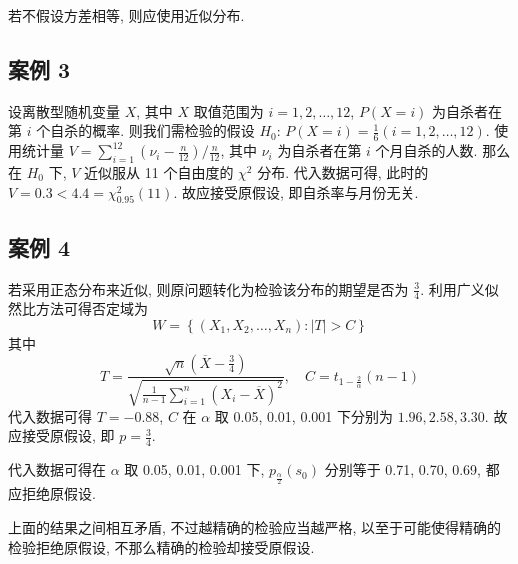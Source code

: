 \documentclass[\ROOT/main.tex]{subfiles}
\begin{document}
若不假设方差相等, 则应使用近似分布.

\subsection{案例 3}
设离散型随机变量 $X$, 其中 $X$ 取值范围为 $i = 1, 2, \dots, 12$, $P \left( X = i \right)$ 为自杀者在第 $i$ 个自杀的概率.
则我们需检验的假设 $H_0$: $P \left( X = i \right) = \frac{1}{6} \left( i = 1, 2, \dots, 12 \right)$.
使用统计量 $V = \sum_{i = 1}^{12} \left( \nu_i - \frac{n}{12} \right) / \frac{n}{12}$, 其中 $\nu_i$ 为自杀者在第 $i$ 个月自杀的人数.
那么在 $H_0$ 下, $V$ 近似服从 11 个自由度的 $\chi^2$ 分布.
代入数据可得, 此时的 $V = 0.3 < 4.4 = \chi_{0.95}^2 \left( 11 \right)$.
故应接受原假设, 即自杀率与月份无关.

\subsection{案例 4}
若采用正态分布来近似, 则原问题转化为检验该分布的期望是否为 $\frac{3}{4}$.
利用广义似然比方法可得否定域为
\[
    W = \left\{ (X_1, X_2, \dots, X_n) : \left| T \right| > C \right\}
\]
其中
\[
    T = \frac{\sqrt{n} \left( \overline{X} - \frac{3}{4} \right)}{\sqrt{\frac{1}{n - 1} \sum_{i = 1}^{n} \left( X_i - \overline{X} \right)^2}}
    , \quad
    C = t_{1 - \frac{2}{\alpha}} \left( n - 1 \right)
\]
代入数据可得 $T = - 0.88$, $C$ 在 $\alpha$ 取 0.05, 0.01, 0.001 下分别为 $1.96, 2.58, 3.30$.
故应接受原假设, 即 $p = \frac{3}{4}$.

代入数据可得在 $\alpha$ 取 0.05, 0.01, 0.001 下,
$p_{\frac{\alpha}{2}} \left( s_0 \right)$ 分别等于 0.71, 0.70, 0.69, 都应拒绝原假设.

上面的结果之间相互矛盾, 不过越精确的检验应当越严格, 以至于可能使得精确的检验拒绝原假设, 不那么精确的检验却接受原假设.
\end{document}
